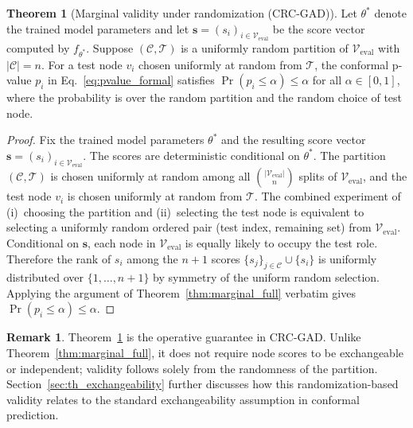 \documentclass[a4paper]{cas-dc}
\theoremstyle{definition}
\newtheorem{theorem}{Theorem}
\newtheorem{remark}{Remark}
\begin{document}
\begin{theorem}[Marginal validity under randomization (CRC-GAD)]
\label{thm:randomization}
Let $\theta^*$ denote the trained model parameters and let $\mathbf{s} = (s_i)_{i \in \mathcal{V}_{\text{eval}}}$ be the score vector computed by $f_{\theta^*}$.  Suppose $(\mathcal{C}, \mathcal{T})$ is a uniformly random partition of $\mathcal{V}_{\text{eval}}$ with $|\mathcal{C}| = n$.  For a test node $v_i$ chosen uniformly at random from $\mathcal{T}$, the conformal p-value $p_i$ in Eq.~\eqref{eq:pvalue_formal} satisfies $\Pr(p_i \leq \alpha) \leq \alpha$ for all $\alpha \in [0,1]$, where the probability is over the random partition and the random choice of test node.
\end{theorem}

\begin{proof}
Fix the trained model parameters $\theta^*$ and the resulting score vector $\mathbf{s} = (s_i)_{i \in \mathcal{V}_{\text{eval}}}$.  The scores are deterministic conditional on $\theta^*$.  The partition $(\mathcal{C}, \mathcal{T})$ is chosen uniformly at random among all $\binom{|\mathcal{V}_{\text{eval}}|}{n}$ splits of $\mathcal{V}_{\text{eval}}$, and the test node $v_i$ is chosen uniformly at random from $\mathcal{T}$.  The combined experiment of (i)~choosing the partition and (ii)~selecting the test node is equivalent to selecting a uniformly random ordered pair (test index, remaining set) from $\mathcal{V}_{\text{eval}}$.  Conditional on $\mathbf{s}$, each node in $\mathcal{V}_{\text{eval}}$ is equally likely to occupy the test role.  Therefore the rank of $s_i$ among the $n+1$ scores $\{s_j\}_{j \in \mathcal{C}} \cup \{s_i\}$ is uniformly distributed over $\{1, \ldots, n+1\}$ by symmetry of the uniform random selection.  Applying the argument of Theorem~\ref{thm:marginal_full} verbatim gives $\Pr(p_i \leq \alpha) \leq \alpha$.
\end{proof}

\begin{remark}
Theorem~\ref{thm:randomization} is the operative guarantee in CRC-GAD.  Unlike Theorem~\ref{thm:marginal_full}, it does not require node scores to be exchangeable or independent; validity follows solely from the randomness of the partition.  Section~\ref{sec:th_exchangeability} further discusses how this randomization-based validity relates to the standard exchangeability assumption in conformal prediction.
\end{remark}
\end{document}
